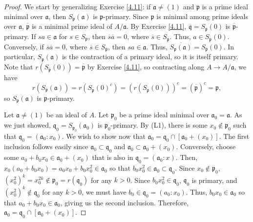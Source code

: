 \begin{proof}
We start by generalizing Exercise \ref{4.11}: if $\mathfrak{a} \neq (1)$ and $\mathfrak{p}$ is a prime ideal minimal over $\mathfrak{a}$, then $S_{\mathfrak{p}}(\mathfrak{a})$ is $\mathfrak{p}$-primary. Since
$\mathfrak{p}$ is minimal among prime ideals over $\mathfrak{a}$, $\overline{\mathfrak{p}}$ is a minimal prime ideal of $A/\mathfrak{a}$. By Exercise \ref{4.11}, $\overline{\mathfrak{q}} = S_{\overline{\mathfrak{p}}}(0)$
is $\overline{\mathfrak{p}}$-primary. If $sa \in \mathfrak{a}$ for $s \in S_\mathfrak{p}$, then $\overline{s} \overline{a} = 0$, where $\overline{s} \in S_\overline{\mathfrak{p}}$. Thus, $a \in S_{\overline{\mathfrak{p}}}(0)$.
Conversely, if $\overline{s} \overline{a} = 0$, where $\overline{s} \in S_\overline{\mathfrak{p}}$, then $sa \in \mathfrak{a}$. Thus, $\overline{S_{\mathfrak{p}}(\mathfrak{a})} = S_\overline{\mathfrak{p}} (0)$. In particular,
$S_{\mathfrak{p}}(\mathfrak{a})$ is the contraction of a primary ideal, so it is itself primary. Note that
$r(S_{\overline{\mathfrak{p}}}(0)) = \overline{\mathfrak{p}}$ by Exercise \ref{4.11}, so contracting along $A \to A/\mathfrak{a}$, we have 
$$r(S_{\mathfrak{p}}(\mathfrak{a})) = r(S_{\overline{\mathfrak{p}}}(0)^c) = (r(S_{\overline{\mathfrak{p}}}(0)))^c = (\overline{\mathfrak{p}})^c = \mathfrak{p},$$
so $S_{\mathfrak{p}}(\mathfrak{a})$ is $\mathfrak{p}$-primary.

Let $\mathfrak{a} \neq (1)$ be an ideal of $A$. Let $\mathfrak{p}_0$ be a prime ideal minimal over $\mathfrak{a}_0 = \mathfrak{a}$. As we just showed, $\mathfrak{q}_0 = S_{\mathfrak{p}_0}(\mathfrak{a}_0)$ is $\mathfrak{p}_0$-primary.
By (L1), there is some $x_0 \not\in \mathfrak{p}_0$ such that $\mathfrak{q}_0 = (\mathfrak{a}_0 : x_0)$. We wish to show now that $\mathfrak{a}_0 = \mathfrak{q}_0 \cap [\mathfrak{a}_0 + (x_0)]$. The first inclusion follows easily since
$\mathfrak{a}_0 \subset \mathfrak{q}_0$ and $\mathfrak{a}_0 \subset \mathfrak{a}_0 + (x_0)$. Conversely, choose some $a_0 + b_0 x_0 \in \mathfrak{a}_0 + (x_0)$ that is also in $\mathfrak{q}_0 = (\mathfrak{a}_0 : x)$. Then,
$x_0(a_0 + b_0 x_0) = a_0 x_0 + b_0 x_0^2 \in \mathfrak{a}_0$ so that $b_0 x_0^2 \in \mathfrak{a}_0 \subset \mathfrak{q}_0$. Since $x_0 \not\in \mathfrak{p}_0$, $(x_0^2)^k = x_0^{2k} \not\in \mathfrak{p}_0 = r(\mathfrak{q}_0)$ 
for any $k > 0$. Since $b_0 x_0^2 \in \mathfrak{q}_0$, $\mathfrak{q}_0$ is primary, and $(x_0^2)^k \not\in \mathfrak{q}_0$ for any $k > 0$, we must have $b_0 \in \mathfrak{q}_0 = (a_0 : x_0)$. Thus, $b_0x_0 \in \mathfrak{a}_0$
so that $a_0 + b_0 x_0 \in \mathfrak{a}_0$, giving us the second inclusion. Therefore, $\mathfrak{a}_0 = \mathfrak{q}_0 \cap [\mathfrak{a}_0 + (x_0)]$.


\end{proof}
